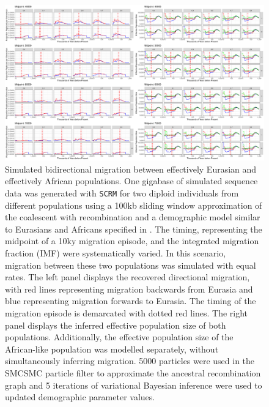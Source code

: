 \begin{figure}
	\centering
	\includegraphics[width=\textwidth]{plot/bidirectional_different_starts.pdf}
	\caption[Simulated bidirectional migration between effectively Eurasian and effectively African populations]{Simulated bidirectional migration between effectively Eurasian and effectively African populations. One gigabase of simulated sequence data was generated with {\tt SCRM} for two diploid individuals from different populations using a 100kb sliding window approximation of the coalescent with recombination and a demographic model similar to Eurasians and Africans specified in . The timing, representing the midpoint of a 10ky migration episode, and the integrated migration fraction (IMF) were systematically varied. In this scenario, migration between these two populations was simulated with equal rates. The left panel displays the recovered directional migration, with red lines representing migration backwards from Eurasia and blue representing migration forwards to Eurasia. The timing of the migration episode is demarcated with dotted red lines. The right panel displays the inferred effective population size of both populations. Additionally, the effective population size of the African-like population was modelled separately, without simultaneously inferring migration. 5000 particles were used in the SMCSMC particle filter to approximate the ancestral recombination graph and 5 iterations of variational Bayesian inference were used to updated demographic parameter values.}
	\label{fig:bisim}
\end{figure}


